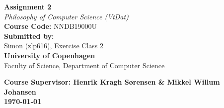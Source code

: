 \documentclass[11pt]{article}
\begin{document}
\begin{titlepage}

    \begin{center}
        \vspace*{7cm}
        {\Huge \textbf{Assignment 2}} \\[0.8cm] {\Large \textit{Philosophy of Computer Science (VtDat)}}
        \\[2cm] {\Large \textbf{Course Code:} NNDB19000U} \\[1.5cm] {\Large \textbf{Submitted by:}}
        \\ Simon (zlp616), Exercise Class 2 \\[1.5cm] {\Large \textbf{University of Copenhagen}}
        \\[0.5cm] {\Large Faculty of Science, Department of Computer Science}
        \\[1.5cm]
    \end{center}
    \vspace*{2.0cm}
    {\textbf{\small Course Supervisor: Henrik Kragh Sørensen \& Mikkel Willum Johansen}} \\
    {\textbf{\small \today}}
    \vfill
\end{titlepage}
\end{document}
